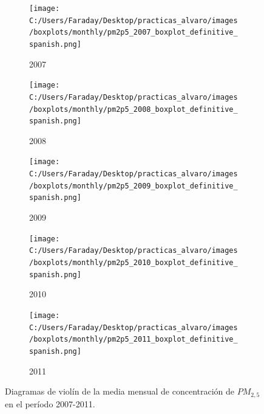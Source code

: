 \documentclass[12pt]{article}
\begin{document}
\begin{figure}[H]
\centering
\begin{subfigure}[H]{0.45\textwidth}
\texttt{[image: C:/Users/Faraday/Desktop/practicas\_alvaro/images/boxplots/monthly/pm2p5\_2007\_boxplot\_definitive\_spanish.png]}
\captionsetup{labelformat=empty}
\caption{2007}
\label{fig:box-pm2p5-2007}
\end{subfigure}
%
\begin{subfigure}[H]{0.45\textwidth}
\texttt{[image: C:/Users/Faraday/Desktop/practicas\_alvaro/images/boxplots/monthly/pm2p5\_2008\_boxplot\_definitive\_spanish.png]}
\captionsetup{labelformat=empty}
\caption{2008}
\label{fig:box-pm2p5-2008}
\end{subfigure}

\begin{subfigure}[H]{0.45\textwidth}
\texttt{[image: C:/Users/Faraday/Desktop/practicas\_alvaro/images/boxplots/monthly/pm2p5\_2009\_boxplot\_definitive\_spanish.png]}
\captionsetup{labelformat=empty}
\caption{2009}
\label{fig:box-pm2p5-2009}
\end{subfigure}
%
\begin{subfigure}[H]{0.45\textwidth}
\texttt{[image: C:/Users/Faraday/Desktop/practicas\_alvaro/images/boxplots/monthly/pm2p5\_2010\_boxplot\_definitive\_spanish.png]}
\captionsetup{labelformat=empty}
\caption{2010}
\label{fig:box-pm2p5-2010}
\end{subfigure}

\begin{subfigure}[H]{0.45\textwidth}
\texttt{[image: C:/Users/Faraday/Desktop/practicas\_alvaro/images/boxplots/monthly/pm2p5\_2011\_boxplot\_definitive\_spanish.png]}
\captionsetup{labelformat=empty}
\caption{2011}
\label{fig:box-pm2p5-2011}
\end{subfigure}
\caption{Diagramas de violín de la media mensual de concentración de $PM_{2,5}$ en el período 2007-2011.}
\label{fig:box-pm2p5-monthly}
\end{figure}
\end{document}
